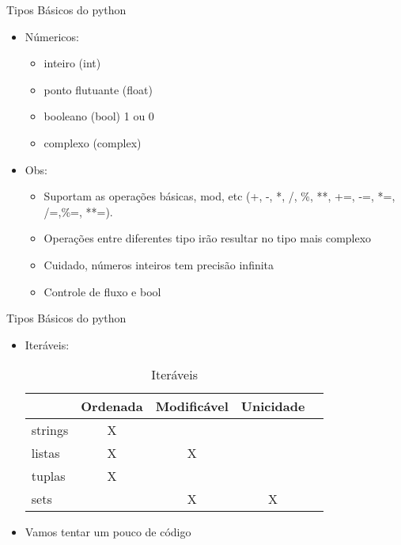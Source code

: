 \begin{frame}{Tipos Básicos do python}
\begin{itemize}
	\item Númericos:
	\begin{itemize}
		\item inteiro (int)
		\item ponto flutuante (float)
		\item booleano (bool) 1 ou 0
		\item complexo (complex)
	\end{itemize}
\end{itemize}
\begin{itemize}
		\item Obs:
		\begin{itemize}
			\item Suportam as operações básicas, mod, etc (+, -, *, /, \%, **, +=, -=, *=, /=,\%=, **=).
			\item Operações entre diferentes tipo irão resultar no tipo mais complexo
			\item Cuidado, números inteiros tem precisão infinita
			\item Controle de fluxo e bool
		\end{itemize}
\end{itemize}
\end{frame}

\begin{frame}{Tipos Básicos do python}
\begin{itemize}
	\item Iteráveis:
	\begin{table}[]
		\centering
		\caption{Iteráveis}
		\label{my-label}
		\begin{tabular}{|l|c|c|l|l|}
			\hline
			\multicolumn{1}{|c|}{} & Ordenada              & Modificável           & \multicolumn{1}{c|}{Unicidade}  \\ \hline
			strings                   & \multicolumn{0}{c|}{X} &                           &                       \\ \hline
			listas                 & X                     & X                     &                                          \\ \hline
			tuplas                 & X                     & \multicolumn{1}{l|}{} &                    \\ \hline
			sets                   & \multicolumn{1}{l|}{} & X                     & \multicolumn{1}{c|}{X}                             \\ \hline
		\end{tabular}
	\end{table}
	\item Vamos tentar um pouco de código
\end{itemize}
		\textbf{}
\end{frame}

